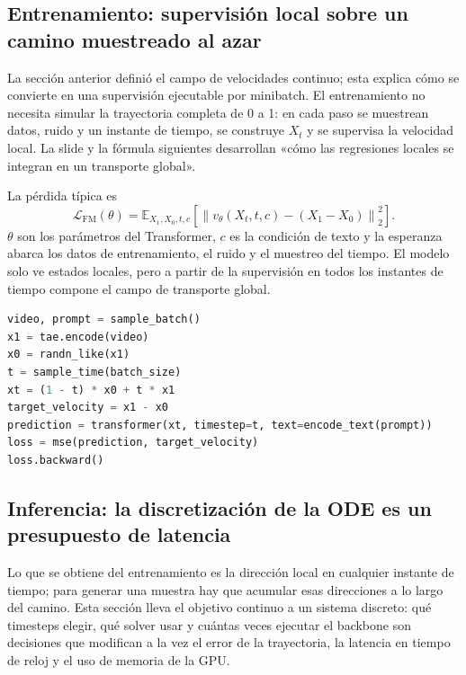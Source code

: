 \subsection{Entrenamiento: supervisión local sobre un camino muestreado al azar}

La sección anterior definió el campo de velocidades continuo; esta explica cómo se convierte en una supervisión ejecutable por minibatch. El entrenamiento no necesita simular la trayectoria completa de 0 a 1: en cada paso se muestrean datos, ruido y un instante de tiempo, se construye $X_t$ y se supervisa la velocidad local. La slide y la fórmula siguientes desarrollan «cómo las regresiones locales se integran en un transporte global».


La pérdida típica es
\[
\mathcal L_{\mathrm{FM}}(\theta)
=\mathbb E_{X_1,X_0,t,c}
\left[\left\|v_\theta(X_t,t,c)-(X_1-X_0)\right\|_2^2\right].
\]
$\theta$ son los parámetros del Transformer, $c$ es la condición de texto y la esperanza abarca los datos de entrenamiento, el ruido y el muestreo del tiempo. El modelo solo ve estados locales, pero a partir de la supervisión en todos los instantes de tiempo compone el campo de transporte global.

\begin{lstlisting}[language=Python,caption={Pseudocódigo de un paso de entrenamiento de Flow Matching condicional}]
video, prompt = sample_batch()
x1 = tae.encode(video)
x0 = randn_like(x1)
t = sample_time(batch_size)
xt = (1 - t) * x0 + t * x1
target_velocity = x1 - x0
prediction = transformer(xt, timestep=t, text=encode_text(prompt))
loss = mse(prediction, target_velocity)
loss.backward()
\end{lstlisting}

\subsection{Inferencia: la discretización de la ODE es un presupuesto de latencia}

Lo que se obtiene del entrenamiento es la dirección local en cualquier instante de tiempo; para generar una muestra hay que acumular esas direcciones a lo largo del camino. Esta sección lleva el objetivo continuo a un sistema discreto: qué timesteps elegir, qué solver usar y cuántas veces ejecutar el backbone son decisiones que modifican a la vez el error de la trayectoria, la latencia en tiempo de reloj y el uso de memoria de la GPU.

